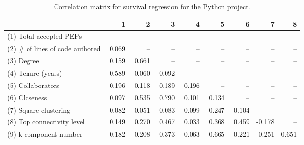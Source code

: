 \begin{table}[H]
\caption{Correlation matrix for survival regression for the Python project.}
\label{corr_table_survival}
\begin{center}
\begin{tabular}{lrrrrrrrr}
\toprule
{} &      1 &      2 &      3 &      4 &      5 &      6 &      7 &     8 \\
\midrule
(1) Total accepted PEPs         &    -- &    -- &    -- &    -- &    -- &    -- &    -- &   -- \\
(2) \# of lines of code authored &  0.069 &    -- &    -- &    -- &    -- &    -- &    -- &   -- \\
(3) Degree                      &  0.159 &  0.661 &    -- &    -- &    -- &    -- &    -- &   -- \\
(4) Tenure (years)              &  0.589 &  0.060 &  0.092 &    -- &    -- &    -- &    -- &   -- \\
(5) Collaborators               &  0.196 &  0.118 &  0.189 &  0.196 &    -- &    -- &    -- &   -- \\
(6) Closeness                   &  0.097 &  0.535 &  0.790 &  0.101 &  0.134 &    -- &    -- &   -- \\
(7) Square clustering           & -0.082 & -0.051 & -0.083 & -0.099 & -0.247 & -0.104 &    -- &   -- \\
(8) Top connectivity level      &  0.149 &  0.270 &  0.467 &  0.033 &  0.368 &  0.459 & -0.178 &   -- \\
(9) k-component number          &  0.182 &  0.208 &  0.373 &  0.063 &  0.665 &  0.221 & -0.251 & 0.651 \\
\bottomrule
\end{tabular}
\end{center} 
\end{table}
